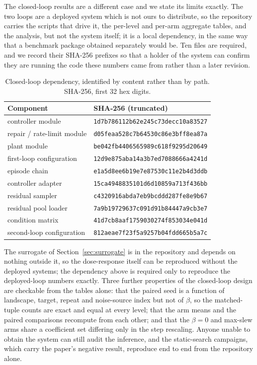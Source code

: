 \documentclass[11pt,a4paper]{article}
\begin{document}
The closed-loop results are a different case and we state its limits exactly. The two loops
are a deployed system which is not ours to distribute, so the repository carries the scripts
that drive it, the per-level and per-arm aggregate tables, and the analysis, but not the
system itself; it is a local dependency, in the same way that a benchmark package obtained
separately would be. Ten files are required, and we record their SHA-256 prefixes so that a
holder of the system can confirm they are running the code these numbers came from rather
than a later revision.

\begin{table}[htbp]
\centering
\small
\caption{Closed-loop dependency, identified by content rather than by path. SHA-256,
first 32 hex digits.}
\label{tab:loopdep}
\begin{tabular}{ll}
\toprule
Component & SHA-256 (truncated) \\
\midrule
controller module & \texttt{1d7b786112b62e245c73decc10a83527} \\
repair / rate-limit module & \texttt{d05feaa528c7b64530c86e3bff8ea87a} \\
plant module & \texttt{be042fb4406565989c618f9295d20649} \\
first-loop configuration & \texttt{12d9e875aba14a3b7ed7088666a4241d} \\
episode chain & \texttt{e1a5d8ee6b19e7e87530c11e2b4d3ddb} \\
controller adapter & \texttt{15ca4948835101d6d10859a713f436bb} \\
residual sampler & \texttt{c4320916abda7eb9bcddd287fe8e9b67} \\
residual pool loader & \texttt{7a9b19729637c091d91b84447a9cb3e7} \\
condition matrix & \texttt{41d7cb8aaf1759030274f853034e041d} \\
second-loop configuration & \texttt{812aeae7f23f5a9257b04fdd665b5a7c} \\
\bottomrule
\end{tabular}
\end{table}

The surrogate of Section~\ref{sec:surrogate} is in the repository and depends on nothing
outside it, so the dose-response itself can be reproduced without the deployed systems; the
dependency above is required only to reproduce the deployed-loop numbers exactly. Three
further properties of the closed-loop design are checkable from the tables alone: that the paired seed is a function of landscape, target, repeat and
noise-source index but not of $\beta$, so the matched-tuple counts are exact and equal at
every level; that the arm means and the paired comparisons recompute from each other; and
that the $\beta = 0$ and max-slew arms share a coefficient set differing only in the step
rescaling. Anyone unable to obtain the system can still audit the inference, and the
static-search campaigns, which carry the paper's negative result, reproduce end to end from
the repository alone.


\end{document}
